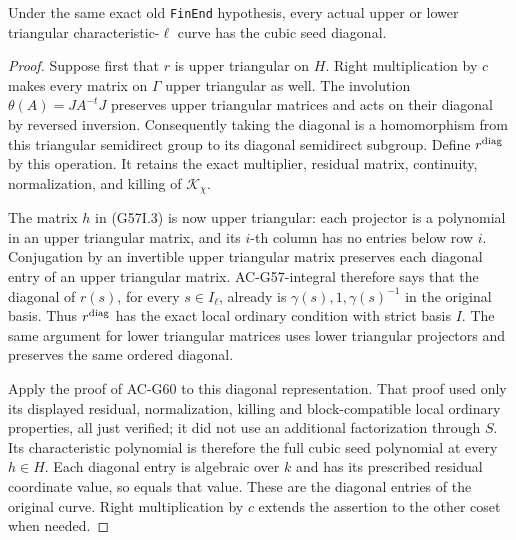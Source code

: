 \begin{corollary}
\label{AC-G60-triangular}
Under the same exact old \texttt{FinEnd} hypothesis,
every actual upper or lower triangular
characteristic-\(\ell\) curve has the cubic seed diagonal.
\end{corollary}
\begin{proof}
Suppose first that \(r\) is upper triangular on \(H\).
Right multiplication by \(c\) makes every matrix on
\(\Gamma\) upper triangular as well.
The involution \(\theta(A)=JA^{-t}J\) preserves upper
triangular matrices and acts on their diagonal by
reversed inversion.  Consequently taking the diagonal
is a homomorphism from this triangular semidirect group
to its diagonal semidirect subgroup.
Define \(r^{\rm diag}\) by this operation.
It retains the exact multiplier, residual matrix,
continuity, normalization, and killing of
\(\mathcal K_\chi\).

The matrix \(h\) in (G57I.3) is now upper triangular:
each projector is a polynomial in an upper triangular
matrix, and its \(i\)-th column has no entries below
row \(i\).  Conjugation by an invertible upper
triangular matrix preserves each diagonal entry of
an upper triangular matrix.
AC-G57-integral therefore says that the diagonal of
\(r(s)\), for every \(s\in I_\ell\), already is
\(\gamma(s),1,\gamma(s)^{-1}\) in the original basis.
Thus \(r^{\rm diag}\) has the exact local ordinary
condition with strict basis \(I\).
The same argument for lower triangular matrices uses
lower triangular projectors and preserves the same
ordered diagonal.

Apply the proof of AC-G60 to this diagonal representation.
That proof used only its displayed residual,
normalization, killing and block-compatible local
ordinary properties, all just verified; it did not use
an additional factorization through \(S\).
Its characteristic polynomial is therefore the full
cubic seed polynomial at every \(h\in H\).
Each diagonal entry is algebraic over \(k\) and has
its prescribed residual coordinate value, so equals
that value.  These are the diagonal entries of the
original curve.  Right multiplication by \(c\)
extends the assertion to the other coset when needed.
\end{proof}


